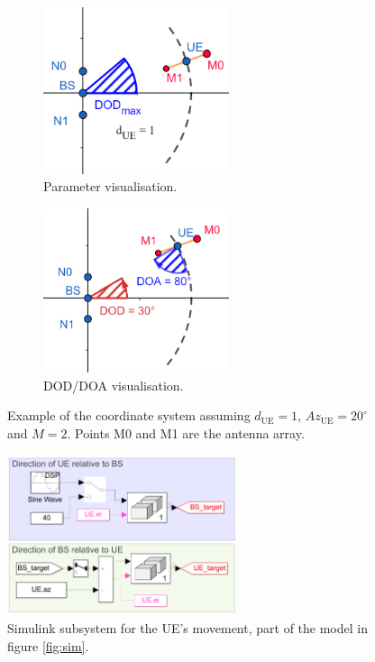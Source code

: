 \documentclass[12pt,a4paper]{report}
\newcommand{\due}{d_{\text{UE}}}
\newcommand{\Azue}{Az_{\text{UE}}}
\begin{document}
\begin{figure}[h]
\begin{subfigure}{0.5\textwidth}
    \centering
    \includegraphics[width = 0.6\textwidth]{Figures/simulation_environment.png}
    \caption{Parameter visualisation.}
    \label{fig:coordinte}
\end{subfigure}
\begin{subfigure}{0.5\textwidth}
    \centering
    \includegraphics[width = 0.6\textwidth]{Figures/simulation_environment_angles.png}
    \caption{DOD/DOA visualisation.}
    \label{fig:angles}
\end{subfigure}
\caption[Example of the coordinate system.]{Example of the coordinate system assuming $\due = 1$, $\Azue = 20^\circ$ and $M = 2$. Points M0 and M1 are the antenna array.}
\label{fig:coordinate_examples}
\end{figure}

\begin{figure}[!h]
    \centering
    \includegraphics[width = 0.6\textwidth]{Figures/SL_movement.png}
    \caption[Simulink subsystem for the UE's movement.]{Simulink subsystem for the UE's movement, part of the model in figure \ref{fig:sim}.}
    \label{fig:sl:movement}
\end{figure}
\end{document}
